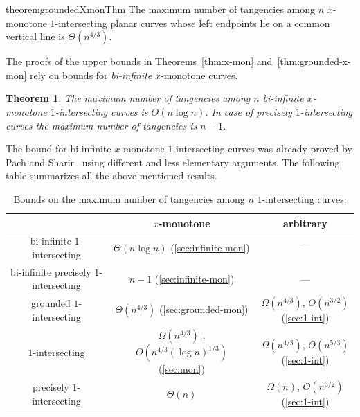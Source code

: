 \documentclass[11pt]{article}
\newtheorem{theorem}{Theorem}
\theoremstyle{definition}
\def\C{{\cal C}}
\begin{document}
\begin{restatable}{theorem}{groundedXmonThm}\label{thm:grounded-x-mon}
	The maximum number of tangencies among $n$ $x$-monotone $1$-intersecting planar curves whose left endpoints lie on a common vertical line is $\Theta(n^{4/3})$.
\end{restatable}

The proofs of the upper bounds in Theorems~\ref{thm:x-mon} and~\ref{thm:grounded-x-mon} rely on bounds for \emph{bi-infinite} $x$-monotone curves.
\begin{theorem}\label{thm:bi-infinite}
	The maximum number of tangencies among $n$ bi-infinite $x$-monotone $1$-intersecting curves is $\Theta(n\log n)$. In case of precisely $1$-intersecting curves the maximum number of tangencies is $n-1$.
\end{theorem}

The bound for bi-infinite $x$-monotone $1$-intersecting curves was already proved by Pach and Sharir~\cite{Pach-Sharir} using different and less elementary arguments.
The following table summarizes all the above-mentioned results. 



\begin{table}[h]
\centering
	\begin{tabular}{|c|c|c|}
		\hline
		&  $x$-monotone & arbitrary \\ \hline
		bi-infinite $1$-intersecting & $\Theta(n \log n)$ \cite{Pach-Sharir} (\autoref{sec:infinite-mon}) & --- \\ \hline
		bi-infinite precisely $1$-intersecting & $n-1$ (\autoref{sec:infinite-mon}) & --- \\ \hline
		grounded $1$-intersecting & $\Theta(n^{4/3})$ (\autoref{sec:grounded-mon}) & $\Omega(n^{4/3})$, $O(n^{3/2})$ (\autoref{sec:1-int}) \\ \hline
		$1$-intersecting & $\Omega(n^{4/3})$ \cite{Pach-Sharir}, $O(n^{4/3}(\log n)^{1/3})$ (\autoref{sec:mon}) & $\Omega(n^{4/3})$, $O(n^{5/3})$ (\autoref{sec:1-int})\\ \hline
		precisely $1$-intersecting & 	$\Theta(n)$ \cite{x-mon} & $\Omega(n)$, $O(n^{3/2})$ (\autoref{sec:1-int}) \\ \hline
	\end{tabular} 
	\caption{Bounds on the maximum number of tangencies among $n$ $1$-intersecting curves.}
\end{table}
\end{document}
